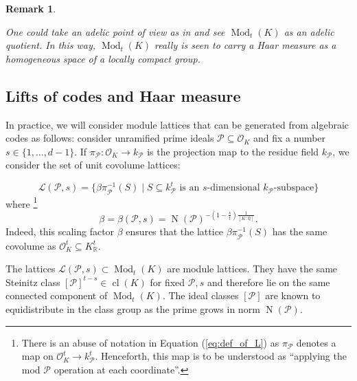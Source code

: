 \documentclass{amsart}
\newtheorem{remark}[theorem]{Remark}
\DeclareMathOperator{\ML}{Mod}
\DeclareMathOperator{\Cl}{cl}
\DeclareMathOperator{\N}{N}
\begin{document}
	\fi


\begin{remark}
\label{re:adelic}

One could take an adelic point of view as in \cite{DK22} and see $\ML_t(K)$ as an adelic quotient. 
In this way, $\ML_t(K)$ really is seen to carry a Haar measure as a homogeneous space of a locally compact group.
\end{remark}

\subsection{Lifts of codes and Haar measure}

In practice, we will consider module lattices that can be generated from algebraic codes as follows: consider unramified prime ideals $\mathcal{P}\subseteq \mathcal{O}_K$ and fix a number $s \in \{1,\dots,d-1\}$. If $\pi_\mathcal{P}:\mathcal{O}_K \rightarrow k_\mathcal{P}$ is the projection map to the residue field $k_\mathcal{P}$, we consider the set of unit covolume lattices:

\begin{equation}
\mathcal{L}(\mathcal{P},s) = \{ \beta \pi_\mathcal{P}^{-1}(S) \mid S\subseteq k_\mathcal{P}^{t} \text{ is an $s$-dimensional $k_\mathcal{P}$-subspace}\}
\label{eq:def_of_L}
\end{equation}
where 
\footnote{
	There is an abuse of notation in Equation (\ref{eq:def_of_L}) as $\pi_\mathcal{P}$ denotes a map on $\mathcal{O}_K^{t}\rightarrow k_\mathcal{P}^{t}$. Henceforth, this map is to be understood as ``applying the mod $\mathcal{P}$ operation at each coordinate''.
}
\begin{equation}
\beta = \beta(\mathcal{P},s) = \N(\mathcal{P})^{-\left(1-\frac{s}{t}\right)\frac{1}{[K:\mathbb{Q}]}}.
\end{equation}
Indeed, this scaling factor $\beta$ ensures that the lattice $ \beta \pi_\mathcal{P}^{-1}(S)$ has the same covolume as $\mathcal{O}_K^{t} \subseteq K_\mathbb{R}^{t}$.

The lattices $\mathcal{L}(\mathcal{P},s) \subset \ML_{t}(K)$ are module lattices. They have the same Steinitz class $[\mathcal{P}]^{t-s}\in \Cl(K)$ for fixed $\mathcal{P},s$ and therefore lie on the same connected component of $\ML_{t}(K)$. The ideal classes $[\mathcal{P}]$ are known to equidistribute in the class group as the prime grows in norm $\N(\mathcal{P})$. 
\end{document}
